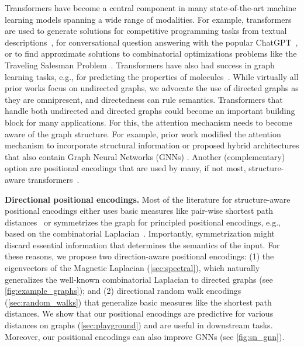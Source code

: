 \documentclass{article}
\begin{document}
Transformers have become a central component in many state-of-the-art machine learning models spanning a wide range of modalities. For example, transformers are used to generate solutions for competitive programming tasks from textual descriptions~\citep{li_competition-level_2022}, for conversational question answering with the popular ChatGPT~\citep{openai_chatgpt_2022}, or to find approximate solutions to combinatorial optimizations problems like the Traveling Salesman Problem~\citep{kool_attention_2019}. 
Transformers have also had success in graph learning tasks, e.g., for predicting the properties of molecules~\citep{min_transformer_2022}. While virtually all prior works focus on undirected graphs, we advocate the use of directed graphs as they are omnipresent, and directedness can rule semantics. Transformers that handle both undirected and directed graphs could become an important building block for many applications. For this, the attention mechanism needs to become aware of the graph structure. For example, prior work modified the attention mechanism to incorporate structural information \citep{ying_transformers_2021} or proposed hybrid architectures that also contain Graph Neural Networks (GNNs) \citep{mialon_graphit_2021, chen_structure-aware_2022}. Another (complementary) option are positional encodings that are used by many, if not most, structure-aware transformers~\citep{min_transformer_2022, muller_attending_2023}.

\textbf{Directional positional encodings.}
Most of the literature for structure-aware positional encodings either uses basic measures like pair-wise shortest path distances~\citep{guo_graphcodebert_2021, ying_transformers_2021} or symmetrizes the graph for principled positional encodings, e.g., based on the combinatorial Laplacian~\citep{dwivedi_generalization_2021,kreuzer_rethinking_2021}. Importantly, symmetrization might discard essential information that determines the semantics of the input. 
For these reasons, we propose two direction-aware positional encodings: (1) the eigenvectors of the Magnetic Laplacian (\autoref{sec:spectral}), which naturally generalizes the well-known combinatorial Laplacian to directed graphs (see \autoref{fig:example_graphs}); and (2) directional random walk encodings  (\autoref{sec:random_walks}) that generalize basic measures like the shortest path distances. We show that our positional encodings are predictive for various distances on graphs (\autoref{sec:playground}) and are useful in downstream tasks. Moreover, our positional encodings can also improve GNNs (see \autoref{fig:sn_gnn}).
\end{document}
